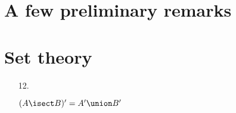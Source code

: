 \section{A few preliminary remarks}
\section{Set theory}
\begin{enumerate}
\item[12.]
  \begin{claim*}
    $(A \isect B)' = A' \union B'$
  \end{claim*}
\end{enumerate}
